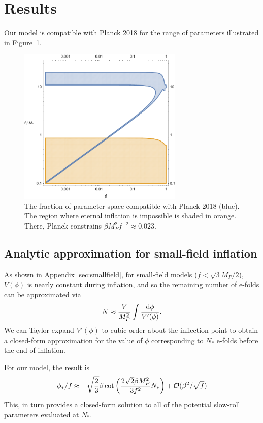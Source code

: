 \documentclass[aps,amsfonts,amsmath,prd,preprint,nofootinbib,superscriptaddress]{revtex4}
\newcommand{\Mp}{{M_{P}}}
\newcommand{\MMp}{{M_P^2}}
\newcommand{\rmd}{{\rm d}}
\begin{document}
\section{Results}

Our model is compatible with Planck 2018 for the range of parameters illustrated in Figure~\ref{fig:parameters}.  

\begin{figure}[!h]
  \centering
    \includegraphics[width=0.7\textwidth]{figures/fbregionPlanck2018.pdf}
    \caption{The fraction of parameter space compatible with Planck 2018 (blue).  The region where eternal inflation is impossible is shaded in orange.  There, Planck constrains $\beta \MMp f^{-2} \approx 0.023$.}\label{fig:parameters}
\end{figure}



\subsection{Analytic approximation for small-field inflation}
As shown in Appendix \ref{sec:smallfield}, for small-field models ($f < \sqrt{3}\Mp/2$), $V(\phi)$ is nearly constant during inflation, and so the remaining number of e-folds can be approximated via
\begin{align}
N \approx \frac{V}{\MMp}\int\frac{\rmd\phi}{V'(\phi)}.
\end{align}
We can Taylor expand $V'(\phi)$ to cubic order about the inflection point to obtain a closed-form approximation for the value of $\phi$ corresponding to $N_\ast$ e-folds before the end of inflation.


For our model, the result is
\begin{align}
\phi_\ast/f \approx -\sqrt{\frac{2}{3}}\beta \cot\left(\frac{2\sqrt{2}\beta\MMp}{3f^2}N_\ast\right) + {\cal O}(\beta^2/\sqrt{f})
\end{align}  
This, in turn provides a closed-form solution to all of the potential slow-roll parameters
evaluated at $N_\ast$.
\end{document}
